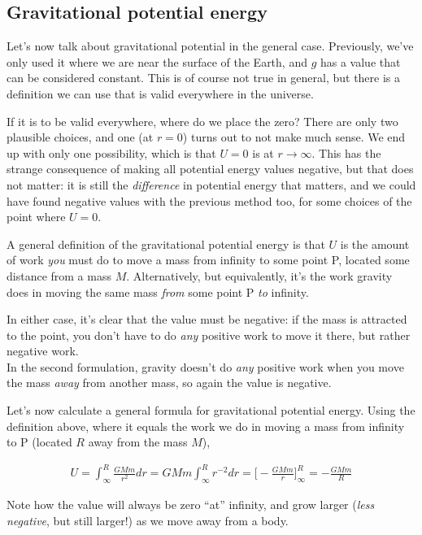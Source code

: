 \subsection{Gravitational potential energy}

Let's now talk about gravitational potential in the general case. Previously, we've only used it where we are near the surface of the Earth, and $g$ has a value that can be considered constant. This is of course not true in general, but there is a definition we can use that is valid everywhere in the universe.

If it is to be valid everywhere, where do we place the zero? There are only two plausible choices, and one (at $r = 0$) turns out to not make much sense. We end up with only one possibility, which is that $U = 0$ is at $r \to \infty$. This has the strange consequence of making all potential energy values negative, but that does not matter: it is still the \emph{difference} in potential energy that matters, and we could have found negative values with the previous method too, for some choices of the point where $U = 0$.

A general definition of the gravitational potential energy is that $U$ is the amount of work \emph{you} must do to move a mass from infinity to some point P, located some distance from a mass $M$. Alternatively, but equivalently, it's the work gravity does in moving the same mass \emph{from} some point P \emph{to} infinity.

In either case, it's clear that the value must be negative: if the mass is attracted to the point, you don't have to do \emph{any} positive work to move it there, but rather negative work.\\
In the second formulation, gravity doesn't do \emph{any} positive work when you move the mass \emph{away} from another mass, so again the value is negative.

Let's now calculate a general formula for gravitational potential energy. Using the definition above, where it equals the work we do in moving a mass from infinity to P (located $R$ away from the mass $M$),

\begin{align}
U = \int_\infty^R \frac{G M m}{r^2} dr = G M m \int_\infty^R r^{-2} dr = \Big[-\frac{G M m}{r}\Big]_\infty^R = -\frac{G M m}{R}
\end{align}

Note how the value will always be zero ``at'' infinity, and grow larger (\emph{less negative}, but still larger!) as we move away from a body.

